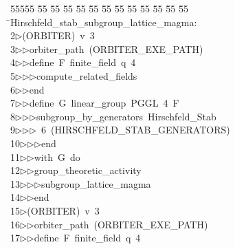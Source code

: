 %
%
\begin{tabbing}
55555 \= 55 \= 55 \= 55 \= 55 \= 55 \= 55 \= 55 \= 55 \= 55 \= 55 \= 55 \= 55 \= \>Hirschfeld\_stab\_subgroup\_lattice\_magma:\\[0pt]
2\>$\triangleright$\>(ORBITER)\ v\ 3\ \\[0pt]
3\>$\triangleright$\>$\triangleright$\>orbiter\_path\ (ORBITER\_EXE\_PATH)\ \\[0pt]
4\>$\triangleright$\>$\triangleright$\>define\ F\ finite\_field\ q\ 4\ \\[0pt]
5\>$\triangleright$\>$\triangleright$\>$\triangleright$\>compute\_related\_fields\ \\[0pt]
6\>$\triangleright$\>$\triangleright$\>end\ \\[0pt]
7\>$\triangleright$\>$\triangleright$\>define\ G\ linear\_group\ PGGL\ 4\ F\ \\[0pt]
8\>$\triangleright$\>$\triangleright$\>$\triangleright$\>subgroup\_by\_generators\ Hirschfeld\_Stab\ \\[0pt]
9\>$\triangleright$\>$\triangleright$\>$\triangleright$\ 6\ (HIRSCHFELD\_STAB\_GENERATORS)\ \\[0pt]
10\>$\triangleright$\>$\triangleright$\>$\triangleright$\>end\ \\[0pt]
11\>$\triangleright$\>$\triangleright$\>with\ G\ do\ \\[0pt]
12\>$\triangleright$\>$\triangleright$\>group\_theoretic\_activity\ \\[0pt]
13\>$\triangleright$\>$\triangleright$\>$\triangleright$\>subgroup\_lattice\_magma\ \\[0pt]
14\>$\triangleright$\>$\triangleright$\>end\\[0pt]
15\>$\triangleright$\>(ORBITER)\ v\ 3\ \\[0pt]
16\>$\triangleright$\>$\triangleright$\>orbiter\_path\ (ORBITER\_EXE\_PATH)\ \\[0pt]
17\>$\triangleright$\>$\triangleright$\>define\ F\ finite\_field\ q\ 4\ \\[0pt]

\end{tabbing}
